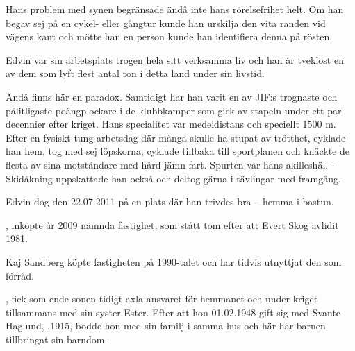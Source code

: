 Hans problem med synen begränsade ändå inte hans rörelsefrihet helt. Om han begav sej på en cykel- eller gångtur kunde han urskilja den vita randen vid vägens kant och mötte han en person kunde han identifiera denna på rösten.

Edvin var sin arbetsplats trogen hela sitt verksamma liv och han är tveklöst en av dem som lyft flest antal ton i detta land under sin livstid.

Ändå finns här en paradox. Samtidigt har han varit en av JIF:s trognaste och pålitligaste poängplockare i de klubbkamper som gick av stapeln under ett par decennier efter kriget. Hans specialitet var medeldistans och speciellt 1500 m. Efter en fysiskt tung arbetsdag där många skulle ha stupat av trötthet, cyklade han hem, tog med sej löpskorna, cyklade tillbaka till sportplanen och knäckte de flesta av sina motståndare med  hård jämn fart. Spurten var hans akilleshäl. - Skidåkning uppskattade han också och deltog gärna i tävlingar med framgång.

Edvin dog den 22.07.2011 på en plats där han trivdes bra – hemma i bastun.



, inköpte år 2009 nämnda fastighet, som stått tom efter att Evert Skog avlidit 1981.\jhvspace{}


Kaj Sandberg köpte fastigheten på 1990-talet och har tidvis utnyttjat den som förråd.\jhvspace{}



, fick som ende sonen tidigt axla ansvaret för hemmanet och under kriget tillsammans med sin syster Ester. Efter att hon 01.02.1948 gift sig med Svante Haglund, .1915, bodde hon med sin familj i samma hus och här har barnen tillbringat sin barndom.
\begin{jhchildren}
  \item {}
  \item {}
  \item {}
  \item {}
  \item {}
\end{jhchildren}


